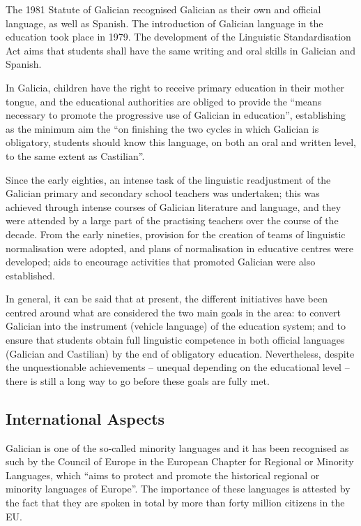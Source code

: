\begin{multicols}{2}
    The 1981 Statute of Galician recognised Galician as their own and official language, as well as Spanish. The introduction of Galician language in the education took place in 1979. The development of the Linguistic Standardisation Act aims that students shall have the same writing and oral skills in Galician and Spanish. 

In Galicia, children have the right to receive primary education in their mother tongue, and the educational authorities are obliged to provide the “means necessary to promote the progressive use of Galician in education”, establishing as the minimum aim the “on finishing the two cycles in which Galician is obligatory, students should know this language, on both an oral and written level, to the same extent as Castilian”. 

Since the early eighties, an intense task of the linguistic readjustment of the Galician primary and secondary school teachers was undertaken; this was achieved through intense courses of Galician literature and language, and they were attended by a large part of the practising teachers over the course of the decade. From the early nineties, provision for the creation of teams of linguistic normalisation were adopted, and plans of normalisation in educative centres were developed; aids to encourage activities that promoted Galician were also established.

In general, it can be said that at present, the different initiatives have been centred around what are considered the two main goals in the area: to convert Galician into the instrument (vehicle language) of the education system; and to ensure that students obtain full linguistic competence in both official languages (Galician and Castilian) by the end of obligatory education. Nevertheless, despite the unquestionable achievements – unequal depending on the educational level -- there is still a long way to go before these goals are fully met.

\subsection{International Aspects}

Galician is one of the so-called minority languages and it has been recognised as such by the Council of Europe in the European Chapter for Regional or Minority Languages, which “aims to protect and promote the historical regional or minority languages of Europe”. The importance of these languages is attested by the fact that they are spoken in total by more than forty million citizens in the EU.


\end{multicols}
